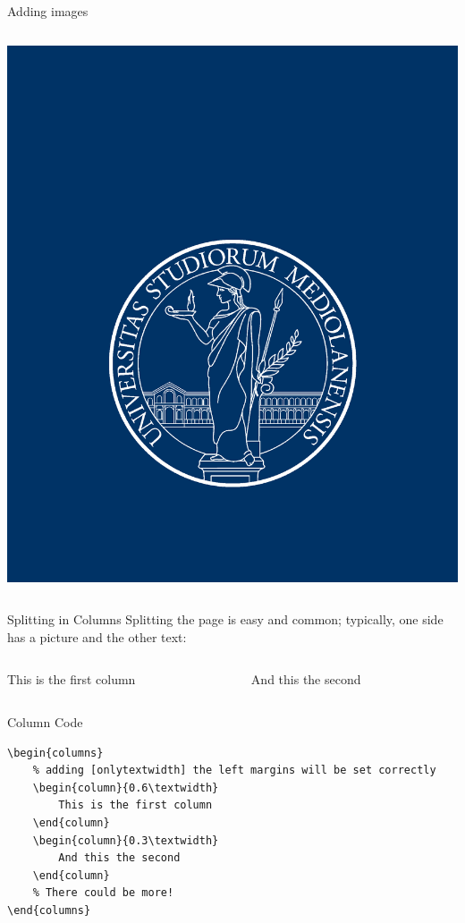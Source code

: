 \begin{frame}[fragile]{Adding images}
\begin{columns}
\begin{column}{0.3\textwidth}
\includegraphics[width=\textwidth]
{ASSETS/logo_RGB}
\end{column}
\end{columns}
\end{frame}


\begin{frame}[fragile]{Splitting in Columns}
Splitting the page is easy and common; typically, one side has a picture and the other text:
\begin{columns}  %
\begin{column}{0.6\textwidth}
This is the first column
\end{column}
\begin{column}{0.3\textwidth}
And this the second
\end{column}
\end{columns}
\begin{block}{Column Code}
\begin{verbatim}
\begin{columns} 
    % adding [onlytextwidth] the left margins will be set correctly
    \begin{column}{0.6\textwidth}
        This is the first column
    \end{column}
    \begin{column}{0.3\textwidth}
        And this the second
    \end{column}
    % There could be more!
\end{columns}
\end{verbatim}
\end{block}

\end{frame}
